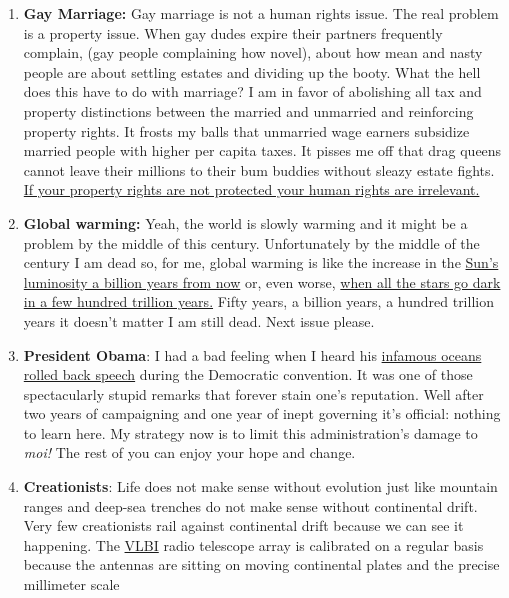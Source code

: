 \begin{enumerate}
\item
  \textbf{Gay Marriage:} Gay marriage is not a human rights issue. The
  real problem is a property issue. When gay dudes expire their partners
  frequently complain, (gay people complaining how novel), about how
  mean and nasty people are about settling estates and dividing up the
  booty. What the hell does this have to do with marriage? I am in favor
  of abolishing all tax and property distinctions between the married
  and unmarried and reinforcing property rights. It frosts my balls that
  unmarried wage earners subsidize married people with higher per capita
  taxes. It pisses me off that drag queens cannot leave their millions
  to their bum buddies without sleazy estate fights.
  \href{http://mises.org/daily/2569}{If your property rights are not
  protected your human rights are irrelevant.}\emph{}
\item
  \textbf{Global warming:} Yeah, the world is slowly warming and it
  might be a problem by the middle of this century. Unfortunately by the
  middle of the century I am dead so, for me, global warming is like the
  increase in the
  \href{http://j.dollan.home.bresnan.net/MUSunLife.html}{Sun's
  luminosity a billion years from now} or, even worse,
  \href{http://en.wikipedia.org/wiki/Future\_of\_an\_expanding\_universe\#Star\_formation\_ceases}{when
  all the stars go dark in a few hundred trillion years.} Fifty years, a
  billion years, a hundred trillion years it doesn't matter I am still
  dead. Next issue please.
\item
  \textbf{President Obama}: I had a bad feeling when I heard his
  \href{http://www.youtube.com/watch?v=u2pZSvq9bto}{infamous oceans
  rolled back speech} during the Democratic convention. It was one of
  those spectacularly stupid remarks that forever stain one's
  reputation. Well after two years of campaigning and one year of inept
  governing it's official: nothing to learn here. My strategy now is to
  limit this administration's damage to \emph{moi!} The rest of you can
  enjoy your hope and change.
\item
  \textbf{Creationists}: Life does not make sense without evolution just
  like mountain ranges and deep-sea trenches do not make sense without
  continental drift. Very few creationists rail against continental
  drift because we can see it happening. The
  \href{http://www.evlbi.org/links/links.html}{VLBI} radio telescope
  array is calibrated on a regular basis because the antennas are
  sitting on moving continental plates and the precise millimeter scale

\end{enumerate}
